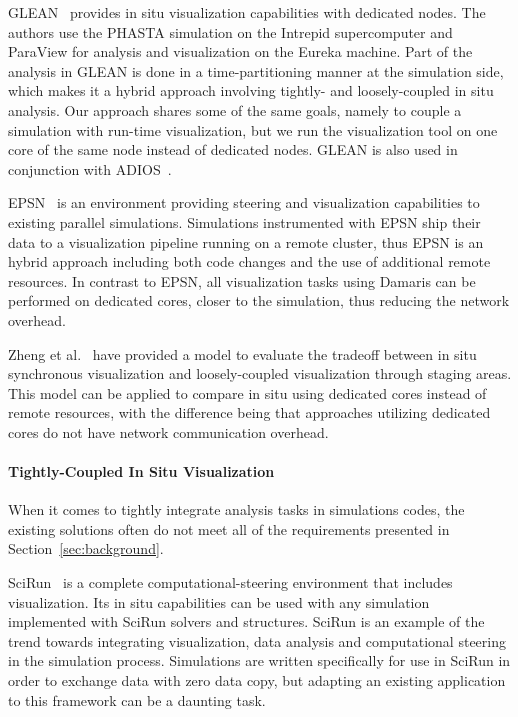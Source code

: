 GLEAN~\cite{rasquin2011electronic} provides in situ visualization capabilities with dedicated nodes. 
The authors use the PHASTA simulation on the Intrepid supercomputer 
and ParaView for analysis and visualization on the Eureka machine. 
Part of the analysis in GLEAN is done in a time-partitioning manner at the simulation side,
which makes it a hybrid approach involving tightly- 
and loosely-coupled in situ analysis. Our approach shares some of the same 
goals, namely to couple a simulation with run-time visualization, but we run the 
visualization tool on one core of the same node instead of dedicated nodes.
GLEAN is also used in conjunction with ADIOS~\cite{moreland2011examples}.

EPSN~\cite{esnard2006steering} is an environment providing steering and 
visualization capabilities to existing parallel simulations. Simulations 
instrumented with EPSN ship their data to a visualization pipeline running on a
remote cluster, thus EPSN is an hybrid approach including both code
changes and the use of additional remote resources. In contrast to EPSN, 
all visualization tasks using Damaris can be performed
on dedicated cores, closer to the simulation, thus reducing the network overhead.

Zheng et al.~\cite{zheng2011insitu} have provided a model to evaluate the tradeoff between 
in situ synchronous visualization and 
loosely-coupled visualization through staging areas. 
This model can be applied to compare in situ 
using dedicated cores instead of remote resources, with the 
difference being that approaches utilizing dedicated cores do not have network communication 
overhead.

\paragraph{Tightly-Coupled In Situ Visualization}
When it comes to tightly integrate analysis tasks in simulations codes, the 
existing solutions often do not meet all of the requirements presented in
Section~\ref{sec:background}.

SciRun~\cite{johnson1999interactive} is a complete computational-steering 
environment that includes visualization. Its in situ capabilities can be used 
with any simulation implemented with SciRun solvers and structures.
SciRun is an example of the trend towards integrating visualization, data 
analysis and computational steering in the simulation process.
Simulations are written specifically for use in SciRun in order to exchange 
data with zero data copy, but  
adapting an existing application to this framework can be a daunting task.

